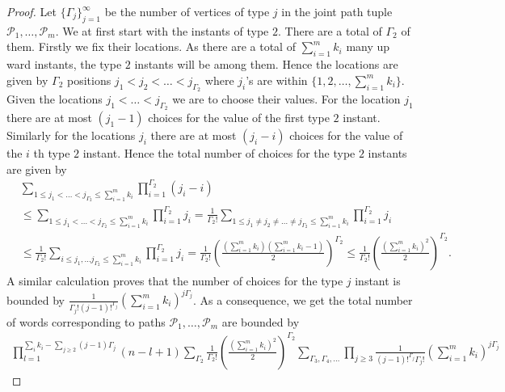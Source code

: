 \documentclass[12pt]{article}
\numberwithin{equation}{section}
\numberwithin{equation}{section}
\theoremstyle{definition}
\renewcommand{\1}{\bf 1}
\begin{document}
\begin{proof}
\noindent 
Let $\{\Gamma_{j}\}_{j=1}^{\infty}$ be the number of vertices of type $j$ in the joint path tuple $\mathcal{P}_{1},\ldots, \mathcal{P}_{m}$. We at first start with the instants of type $2$. There are a total of $\Gamma_{2}$ of them. Firstly we fix their locations. As there are a total of $\sum_{i=1}^{m} k_{i}$ many up ward instants, the type $2$ instants will be among them. Hence the locations are given by $\Gamma_{2}$ positions $j_{1}<j_{2}<\ldots< j_{\Gamma_{2}}$ where $j_{i}$'s are within $\{1,2,\ldots, \sum_{i=1}^{m} k_{i}\}$. Given the locations $j_{1}<\ldots<j_{\Gamma_{2}}$ we are to choose their values. For the location $j_{1}$ there are at most $(j_{1}-1)$ choices for the value of the first type $2$ instant. Similarly for the locations $j_{i}$ there are at most $(j_{i}-i)$ choices for the value of the $i$ th type $2$ instant. Hence the total number of choices for the type $2$ instants are given by 
\begin{equation}\label{eq:type2cont}
\begin{split}
&\sum_{1\le j_{1}< \ldots < j_{\Gamma_{2}}\le \sum_{i=1}^{m} k_{i}} \prod_{i=1}^{\Gamma_{2}} (j_{i}-i) \\
& \le \sum_{1\le j_{1}< \ldots < j_{\Gamma_{2}}\le \sum_{i=1}^{m} k_{i}} \prod_{i=1}^{\Gamma_{2}} j_{i}
 = \frac{1}{\Gamma_{2}!}\sum_{1\le j_{1} \neq j_{2}\neq \ldots \neq j_{\Gamma_{2}}\le \sum_{i=1}^{m} k_{i}} \prod_{i=1}^{\Gamma_{2}} j_{i}\\
 &\le \frac{1}{\Gamma_{2}!} \sum_{i \le j_{1},\ldots j_{\Gamma_{2}}\le \sum_{i=1}^{m}k_{i}} \prod_{i=1}^{\Gamma_{2}} j_{i}= \frac{1}{\Gamma_{2}!} \left(\frac{\left(\sum_{i=1}^{m}k_{i}\right)\left( \sum_{i=1}^{m} k_{i} -1\right)}{2}\right)^{\Gamma_{2}}\le \frac{1}{\Gamma_{2}!}\left( \frac{\left(\sum_{i=1}^{m}k_{i}\right)^{2}}{2} \right)^{\Gamma_{2}}.
\end{split}
\end{equation} 
A similar calculation proves that the number of choices for the type $j$ instant is bounded by $\frac{1}{\Gamma_{j}!(j-1)!^{\Gamma_{j}}}\left( \sum_{i=1}^{m} k_{i} \right)^{j\Gamma_{j}}$. As a consequence, we get the total number of words corresponding to paths $\mathcal{P}_{1},\ldots, \mathcal{P}_{m}$ are bounded by 
\begin{equation}\label{eq:boundwordcountdyck}
\begin{split}
\prod_{l=1}^{\sum_{i}k_{i}- \sum_{j\ge 2}(j-1)\Gamma_{j}} (n-l+1)\sum_{\Gamma_{2}}\frac{1}{\Gamma_{2}!}\left( \frac{\left(\sum_{i=1}^{m}k_{i}\right)^{2}}{2} \right)^{\Gamma_{2}}\sum_{\Gamma_{3},\Gamma_{4},\ldots} \prod_{j\ge 3}\frac{1}{(j-1)!^{\Gamma_{j}}\Gamma_{j}!}\left( \sum_{i=1}^{m} k_{i} \right)^{j\Gamma_{j}}

\end{split}
\end{equation}
\end{proof}
\end{document}
